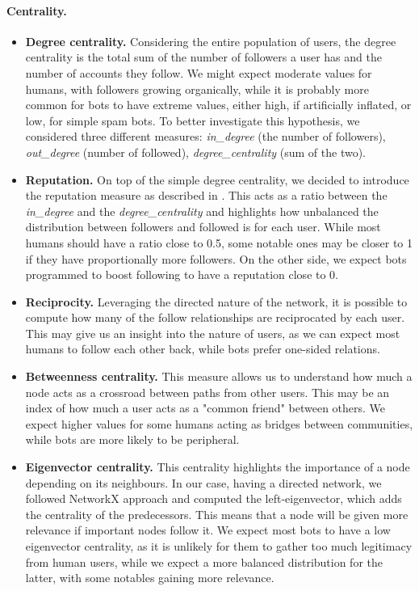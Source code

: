 \documentclass[12pt, a4paper]{article}
\begin{document}
		\paragraph{Centrality.}
		\begin{itemize}
			\item \textbf{Degree centrality.} Considering the entire population of users, the degree centrality is the total sum of the number of followers a user has and the number of accounts they follow. We might expect moderate values for humans, with followers growing organically, while it is probably more common for bots to have extreme values, either high, if artificially inflated, or low, for simple spam bots. To better investigate this hypothesis, we considered three different measures: \textit{in\_degree} (the number of followers), \textit{out\_degree} (number of followed), \textit{degree\_centrality} (sum of the two).
			\item \textbf{Reputation.} On top of the simple degree centrality, we decided to introduce the reputation measure as described in \cite{wang2010}. This acts as a ratio between the \textit{in\_degree} and the \textit{degree\_centrality} and highlights how unbalanced the distribution between followers and followed is for each user. While most humans should have a ratio close to 0.5, some notable ones may be closer to 1 if they have proportionally more followers. On the other side, we expect bots programmed to boost following to have a reputation close to 0.
			\item \textbf{Reciprocity.} Leveraging the directed nature of the network, it is possible to compute how many of the follow relationships are reciprocated by each user. This may give us an insight into the nature of users, as we can expect most humans to follow each other back, while bots prefer one-sided relations.
			\item \textbf{Betweenness centrality.} This measure allows us to understand how much a node acts as a crossroad between paths from other users. This may be an index of how much a user acts as a "common friend" between others. We expect higher values for some humans acting as bridges between communities, while bots are more likely to be peripheral.
			\item \textbf{Eigenvector centrality.} This centrality highlights the importance of a node depending on its neighbours. In our case, having a directed network, we followed NetworkX approach and computed the left-eigenvector, which adds the centrality of the predecessors. This means that a node will be given more relevance if important nodes follow it. We expect most bots to have a low eigenvector centrality, as it is unlikely for them to gather too much legitimacy from human users, while we expect a more balanced distribution for the latter, with some notables gaining more relevance.

\end{itemize}
\end{document}

